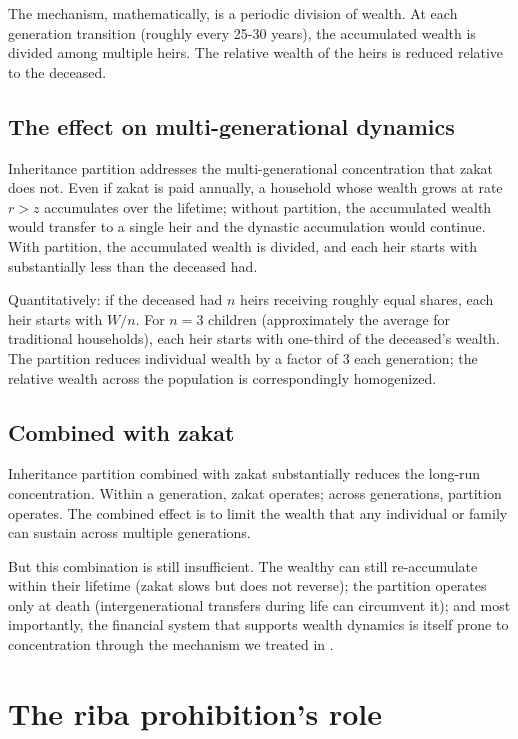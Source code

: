 The mechanism, mathematically, is a periodic division of wealth.
At each generation transition (roughly every 25-30 years), the
accumulated wealth is divided among multiple heirs. The relative
wealth of the heirs is reduced relative to the deceased.

\subsection{The effect on multi-generational dynamics}

Inheritance partition addresses the multi-generational
concentration that zakat does not. Even if zakat is paid annually,
a household whose wealth grows at rate $r > z$ accumulates over
the lifetime; without partition, the accumulated wealth would
transfer to a single heir and the dynastic accumulation would
continue. With partition, the accumulated wealth is divided, and
each heir starts with substantially less than the deceased had.

Quantitatively: if the deceased had $n$ heirs receiving roughly
equal shares, each heir starts with $W/n$. For $n = 3$ children
(approximately the average for traditional households), each heir
starts with one-third of the deceased's wealth. The partition
reduces individual wealth by a factor of 3 each generation; the
relative wealth across the population is correspondingly
homogenized.

\subsection{Combined with zakat}

Inheritance partition combined with zakat substantially reduces
the long-run concentration. Within a generation, zakat operates;
across generations, partition operates. The combined effect is to
limit the wealth that any individual or family can sustain across
multiple generations.

But this combination is still insufficient. The wealthy can still
re-accumulate within their lifetime (zakat slows but does not
reverse); the partition operates only at death (intergenerational
transfers during life can circumvent it); and most importantly,
the financial system that supports wealth dynamics is itself
prone to concentration through the mechanism we treated in
.

\section{The riba prohibition's role}
\label{sec:perm-riba-package}

